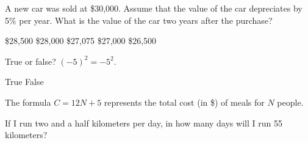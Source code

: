 \documentclass[10pt,answers]{exam}
\begin{document}
\begin{questions}

\question 
A new car was sold at \$30,000. Assume that the value of the car depreciates by 5\% per year. What is the value of the car two years after the purchase?

\begin{oneparchoices}
	\choice \$28,500
	\choice \$28,000
	\CorrectChoice \$27,075
	\choice \$27,000
	\choice \$26,500
	\end{oneparchoices}
	
\question True or false? $\displaystyle (-5)^2=-5^2$.
\begin{oneparchoices}
\choice True
\CorrectChoice False
\end{oneparchoices}

\question The formula $\displaystyle C=12N+5$ represents the total cost (in \$) 	of meals for $N$ people. 
	
	\question If I run two and a half kilometers per day, in how many days will I run 55 kilometers?
	

\end{questions}
\end{document}
